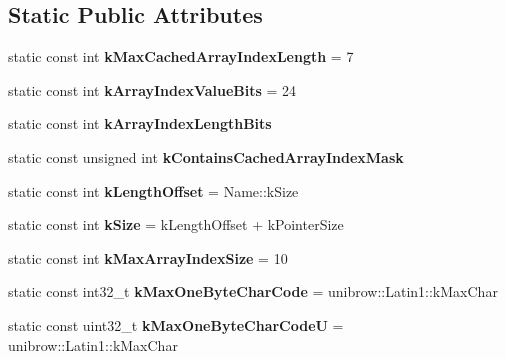 \subsection*{Static Public Attributes}
\begin{DoxyCompactItemize}
\item 
static const int {\bfseries k\+Max\+Cached\+Array\+Index\+Length} = 7\hypertarget{classv8_1_1internal_1_1_string_acc7c2b879f7349a42b0ac606f7d37eb6}{}\label{classv8_1_1internal_1_1_string_acc7c2b879f7349a42b0ac606f7d37eb6}

\item 
static const int {\bfseries k\+Array\+Index\+Value\+Bits} = 24\hypertarget{classv8_1_1internal_1_1_string_a440bc2f0681e058c6e09faa380a35709}{}\label{classv8_1_1internal_1_1_string_a440bc2f0681e058c6e09faa380a35709}

\item 
static const int {\bfseries k\+Array\+Index\+Length\+Bits}
\item 
static const unsigned int {\bfseries k\+Contains\+Cached\+Array\+Index\+Mask}
\item 
static const int {\bfseries k\+Length\+Offset} = Name\+::k\+Size\hypertarget{classv8_1_1internal_1_1_string_a5b21fe7c8b8d212a3f6e48aeaeb00e18}{}\label{classv8_1_1internal_1_1_string_a5b21fe7c8b8d212a3f6e48aeaeb00e18}

\item 
static const int {\bfseries k\+Size} = k\+Length\+Offset + k\+Pointer\+Size\hypertarget{classv8_1_1internal_1_1_string_ab5cf82bcae4ed2d677bac7b8c5c5194a}{}\label{classv8_1_1internal_1_1_string_ab5cf82bcae4ed2d677bac7b8c5c5194a}

\item 
static const int {\bfseries k\+Max\+Array\+Index\+Size} = 10\hypertarget{classv8_1_1internal_1_1_string_ab86c83dacb27eb24739aac51e8254f79}{}\label{classv8_1_1internal_1_1_string_ab86c83dacb27eb24739aac51e8254f79}

\item 
static const int32\+\_\+t {\bfseries k\+Max\+One\+Byte\+Char\+Code} = unibrow\+::\+Latin1\+::k\+Max\+Char\hypertarget{classv8_1_1internal_1_1_string_a3e735a6d2804639dc73f00bc098ac9f8}{}\label{classv8_1_1internal_1_1_string_a3e735a6d2804639dc73f00bc098ac9f8}

\item 
static const uint32\+\_\+t {\bfseries k\+Max\+One\+Byte\+Char\+CodeU} = unibrow\+::\+Latin1\+::k\+Max\+Char\hypertarget{classv8_1_1internal_1_1_string_a343615c57263bde41373316e52b6abf3}{}\label{classv8_1_1internal_1_1_string_a343615c57263bde41373316e52b6abf3}


\end{DoxyCompactItemize}
